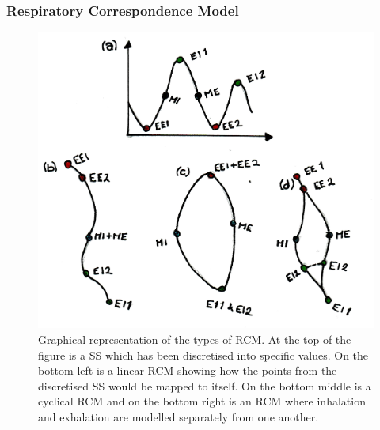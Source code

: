             \subsubsection{Respiratory Correspondence Model} \label{sec:respiratory_correspondence_model}
                \begin{figure}
                    \centering
                            
                    \includegraphics[width=1.0\linewidth]{figures/background_rcm.png}
                            
                    \captionsetup{singlelinecheck=false, justification=raggedright}
                    \caption{Graphical representation of the types of \gls{RCM}. At the top of the figure is a \gls{SS} which has been discretised into specific values. On the bottom left is a linear \gls{RCM} showing how the points from the discretised \gls{SS} would be mapped to itself. On the bottom middle is a cyclical \gls{RCM} and on the bottom right is an \gls{RCM} where inhalation and exhalation are modelled separately from one another.} \label{fig:motion_modelling_rcm}
                \end{figure}
                
